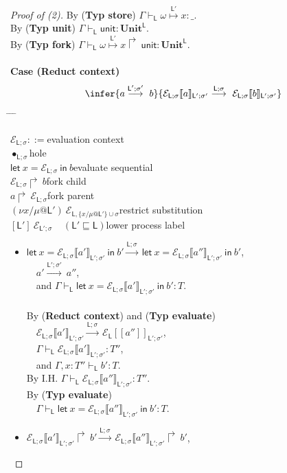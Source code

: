 \documentclass{sigplanconf}
\newenvironment{defn2}{\begin{tabbing}
  \hspace{1.5em} \= \hspace{.295\linewidth - 1.5em} \= \hspace{1.5em} \= \kill
  }{
  \end{tabbing}}
\newcommand{\entry}[2]{\>$#1$\>\>#2}
\newcommand{\clause}[2]{$#1$\>\>#2}
\newcommand{\mycategory}[2]{\clause{#1::=}{#2}}
\newcommand{\lab}{\mathsf L}
\newcommand{\new}[2]{(\nu #1)\:#2}
\newcommand{\action}[1]{\stackrel{#1}{\longrightarrow}~}
\newcommand{\fork}[2]{#1\Rsh\:\!#2}
\newcommand{\eval}[3]{\mathsf{let}~#1=#2~\mathsf{in}~#3}
\newcommand{\store}[1]{\stackrel{#1}\mapsto}
\newcommand{\lctx}[2]{\mathcal E_\lab[\![#1]\!]_{#2}}
\newcommand{\sctx}[2]{\mathcal E_{\lab;\sigma}\llbracket#1\rrbracket_{#2}}
\newcommand{\trule}[1]{(\textbf{Typ #1})}
\newcommand{\rrule}[1]{\textbf{Reduct #1}}
\begin{document}
\begin{proof}[Proof of (2)]
By \trule{store} $\Gamma \vdash_\lab \omega \store{\lab'} x : \_$.\\
By \trule{unit} $\Gamma \vdash_\lab \mathsf{unit} : \mathbf{Unit}^\lab$.\\
By \trule{fork} $\Gamma \vdash_\lab \fork{\omega \store{\lab'} x} \mathsf{unit} : \mathbf{Unit}^\lab$.\\
\\
{\bf Case (Reduct context)}
$$\infer
    {a \action{\lab';\sigma'} b}
    {\sctx a {\lab';\sigma'}\action{\lab;\sigma} \sctx b {\lab';\sigma'}}
$$
\begin{defn2}
\mycategory{\mathcal E_{\lab;\sigma}}{evaluation context} \\
\entry{\bullet_{\lab;\sigma}}{hole} \\
\entry{\eval x {\mathcal E_{\lab;\sigma}} b}{evaluate sequential} \\
\entry{\fork{\mathcal E_{\lab;\sigma}} b}{fork child} \\
\entry{\fork a \mathcal E_{\lab;\sigma}}{fork parent} \\
\entry{\new {x/\mu @\lab'} \mathcal E_{\lab,\{x/\mu@\lab'\}\cup \sigma}}{restrict substitution} \\
\entry{[\lab']~\mathcal E_{\lab';\sigma}~~~~~(\lab' \sqsubseteq \lab)}{lower process label}
\end{defn2}
\begin{itemize}
\item $\eval x {\sctx{a'}{\lab';\sigma'}} b' \action{\lab;\sigma} \eval x {\sctx{a''}{\lab';\sigma'}} b'$,\\
$~~~$ $a' \action{\lab';\sigma'} a''$,\\
$~~~$ and $\Gamma \vdash_\lab \eval x {\sctx{a'}{\lab';\sigma'}} b' : T$.\\
\\
By (\rrule{context}) and \trule{evaluate} \\
$~~~$ $\sctx{a'}{\lab';\sigma'} \action{\lab;\sigma} \lctx{a''}{\lab';\sigma'}$,\\
$~~~$ $\Gamma \vdash_\lab \sctx{a'}{\lab';\sigma'} : T''$, \\
$~~~$ and $\Gamma, x: T'' \vdash_\lab b' : T$.\\
By I.H. $\Gamma \vdash_\lab \sctx{a''}{\lab';\sigma'} : T''$.\\
By \trule{evaluate} \\
$~~~$ $\Gamma \vdash_\lab \eval x {\sctx{a''}{\lab';\sigma'}} b' : T$.\\
\item $\fork {\sctx{a'}{\lab';\sigma'}} b' \action{\lab;\sigma} \fork {\sctx{a''}{\lab';\sigma'}} b'$,\\

\end{itemize}
\end{proof}
\end{document}
